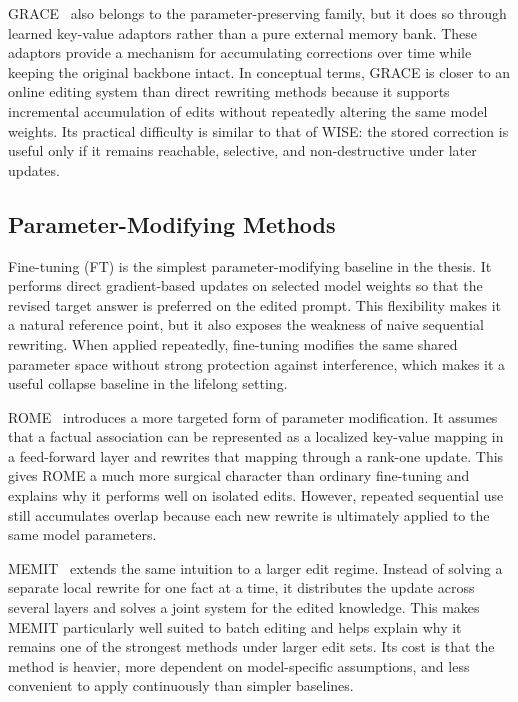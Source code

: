 GRACE~\cite{hartvigsen2023aging} also belongs to the parameter-preserving family, but it does so through learned key-value adaptors rather than a pure external memory bank. These adaptors provide a mechanism for accumulating corrections over time while keeping the original backbone intact. In conceptual terms, GRACE is closer to an online editing system than direct rewriting methods because it supports incremental accumulation of edits without repeatedly altering the same model weights. Its practical difficulty is similar to that of WISE: the stored correction is useful only if it remains reachable, selective, and non-destructive under later updates.

\subsection{Parameter-Modifying Methods}

Fine-tuning (FT) is the simplest parameter-modifying baseline in the thesis. It performs direct gradient-based updates on selected model weights so that the revised target answer is preferred on the edited prompt. This flexibility makes it a natural reference point, but it also exposes the weakness of naive sequential rewriting. When applied repeatedly, fine-tuning modifies the same shared parameter space without strong protection against interference, which makes it a useful collapse baseline in the lifelong setting.

ROME~\cite{meng2022locating} introduces a more targeted form of parameter modification. It assumes that a factual association can be represented as a localized key-value mapping in a feed-forward layer and rewrites that mapping through a rank-one update. This gives ROME a much more surgical character than ordinary fine-tuning and explains why it performs well on isolated edits. However, repeated sequential use still accumulates overlap because each new rewrite is ultimately applied to the same model parameters.

MEMIT~\cite{meng2022mass} extends the same intuition to a larger edit regime. Instead of solving a separate local rewrite for one fact at a time, it distributes the update across several layers and solves a joint system for the edited knowledge. This makes MEMIT particularly well suited to batch editing and helps explain why it remains one of the strongest methods under larger edit sets. Its cost is that the method is heavier, more dependent on model-specific assumptions, and less convenient to apply continuously than simpler baselines.

